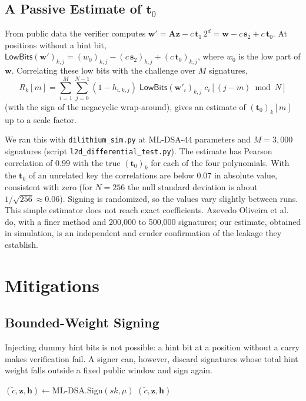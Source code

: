 \documentclass{article}
\newcommand{\hint}{\mathbf{h}}
\newcommand{\sz}{\mathbf{s}_2}
\newcommand{\tzero}{\mathbf{t}_0}
\newcommand{\tone}{\mathbf{t}_1}
\newcommand{\boldA}{\mathbf{A}}
\newcommand{\boldw}{\mathbf{w}}
\newcommand{\boldz}{\mathbf{z}}
\newcommand{\wt}[1]{\mathrm{wt}(#1)}
\newcommand{\LowBits}{\mathsf{LowBits}}
\begin{document}
\subsection{A Passive Estimate of $\tzero$}
\label{sec:passive}

From public data the verifier computes
$\boldw' = \boldA\boldz - c\,\tone\,2^d = \boldw - c\,\sz + c\,\tzero$.  At
positions without a hint bit,
$\LowBits(\boldw')_{k,j} = (w_0)_{k,j} - (c\,\sz)_{k,j} + (c\,\tzero)_{k,j}$,
where $w_0$ is the low part of $\boldw$.  Correlating these low bits with the
challenge over $M$ signatures,
\[
  R_k[m] = \sum_{i=1}^{M}\sum_{j=0}^{N-1}
  (1-h_{i,k,j})\;\LowBits(\boldw'_i)_{k,j}\; c_i[(j-m) \bmod N]
\]
(with the sign of the negacyclic wrap-around), gives an estimate of
$(\tzero)_k[m]$ up to a scale factor.

We ran this with \texttt{dilithium\_sim.py} at ML-DSA-44 parameters and
$M = 3{,}000$ signatures (script \texttt{l2d\_differential\_test.py}).  The
estimate has Pearson correlation of $0.99$ with the true $(\tzero)_k$ for each of
the four polynomials.  With the $\tzero$ of an unrelated key the correlations are
below $0.07$ in absolute value, consistent with zero (for $N = 256$ the null
standard deviation is about $1/\sqrt{256} \approx 0.06$).  Signing is randomized,
so the values vary slightly between runs.  This simple estimator does not reach exact coefficients.
Azevedo Oliveira et al.\ \cite{azevedo2024uncompressing} do, with a finer
method and 200,000 to 500,000 signatures; our estimate, obtained in
simulation, is an independent and cruder confirmation of the leakage they
establish.

\section{Mitigations}
\label{sec:mitigations}

\subsection{Bounded-Weight Signing}
\label{sec:bw}

Injecting dummy hint bits is not possible: a hint bit at a position without a
carry makes verification fail.  A signer can, however, discard signatures
whose total hint weight falls outside a fixed public window and sign again.

\begin{algorithmic}[1]
  \Repeat
    \State $(\tilde{c}, \boldz, \hint) \gets \text{ML-DSA.Sign}(\mathit{sk}, \mu)$
  \Until{$\ell \le \wt{\hint} \le u$}
  \State \Return $(\tilde{c}, \boldz, \hint)$
\EndFunction
\end{algorithmic}
\end{document}
